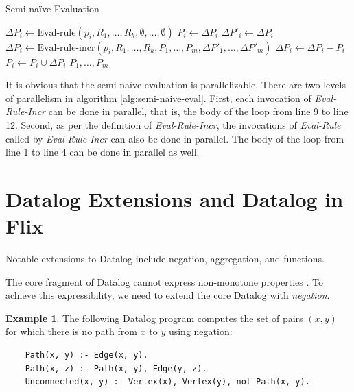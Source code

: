 \documentclass[11pt]{report}
\theoremstyle{definition}
\newtheorem{exmp}{Example}[chapter]
\begin{document}
\begin{algorithm}
  \caption{Semi-na\"ive Evaluation}
  \label{alg:semi-naive-eval}
  \begin{algorithmic}[1]
    \State $\Delta P_i \leftarrow \text{Eval-rule}(p_i, R_1, \ldots, R_k, \emptyset, \ldots, \emptyset)$
    \State $P_i \leftarrow \Delta P_i$
    \EndFor
    \Repeat
    \State $\Delta P'_i \leftarrow \Delta P_i$
    \EndFor
    \State $\Delta P_i \leftarrow \text{Eval-rule-incr}(p_i, R_1, \ldots, R_k, P_1, \ldots, P_m, \Delta P'_1, \ldots, \Delta P'_m)$
    \State $\Delta P_i \leftarrow \Delta P_i - P_i$
    \EndFor
    \State $P_i \leftarrow P_i \cup \Delta P_i$
    \EndFor
    \State \Return $P_1, \ldots, P_m$
  \end{algorithmic}
\end{algorithm}

It is obvious that the semi-naïve evaluation is parallelizable. There are two levels of parallelism in algorithm \ref{alg:semi-naive-eval}. First, each invocation of \textit{Eval-Rule-Incr} can be done in parallel, that is, the body of the loop from line 9 to line 12. Second, as per the definition of \textit{Eval-Rule-Incr}, the invocations of \textit{Eval-Rule} called by \textit{Eval-Rule-Incr} can also be done in parallel. The body of the loop from line 1 to line 4 can be done in parallel as well.

\section{Datalog Extensions and Datalog in Flix}

Notable extensions to Datalog include negation, aggregation, and functions.

The core fragment of Datalog cannot express non-monotone properties \cite{AFRATI1995177}. To achieve this expressibility, we need to extend the core Datalog with \textit{negation}.

\begin{exmp}
  The following Datalog program computes the set of pairs $(x, y)$ for which there is no path from $x$ to $y$ using negation:

  \begin{verbatim}
    Path(x, y) :- Edge(x, y).
    Path(x, z) :- Path(x, y), Edge(y, z).
    Unconnected(x, y) :- Vertex(x), Vertex(y), not Path(x, y).
  \end{verbatim}
\end{exmp}
\end{document}

